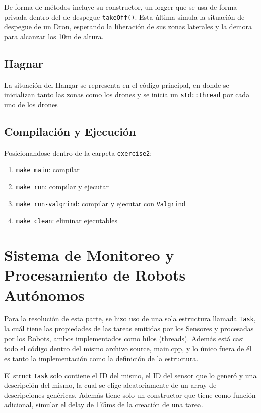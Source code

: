 \documentclass[11pt, a4paper]{article}
\begin{document}
\begin{multicols}{2}
De forma de métodos incluye su constructor, un logger que se usa de forma privada dentro del
de despegue \lstinline|takeOff()|. Esta última simula la situación de despegue de un Dron, esperando
la liberación de sus zonas laterales y la demora para alcanzar los 10m de altura.

\subsection{Hagnar}

La situación del Hangar se representa en el código principal, en donde se inicializan tanto 
las zonas como los drones y se inicia un \lstinline|std::thread| por cada uno de los drones


\subsection{Compilación y Ejecución}

Posicionandose dentro de la carpeta \lstinline|exercise2|:

\begin{enumerate}[label=\roman*.]
    \item \lstinline|make main|: compilar
    \item \lstinline|make run|: compilar y ejecutar
    \item \lstinline|make run-valgrind|: compilar y ejecutar con \lstinline|Valgrind|
    \item \lstinline|make clean|: eliminar ejecutables
\end{enumerate}


\section{Sistema de Monitoreo y Procesamiento de Robots Autónomos}

Para la resolución de esta parte, se hizo uso de una sola estructura
llamada \lstinline|Task|, la cuál tiene las propiedades de las tareas
emitidas por los Sensores y procesadas por los Robots, ambos
implementados como hilos (threads). Además está casi todo el código
dentro del mismo archivo source, main.cpp, y lo único fuera de él es tanto
la implementación como la definición de la estructura.

El struct \lstinline|Task| solo contiene el ID del mismo, el ID del
sensor que lo generó y una descripción del mismo, la cual se elige aleatoriamente
de un array de descripciones genéricas. Además tiene solo un constructor que tiene
como función adicional, simular el delay de 175ms de la creación de una tarea.


\end{multicols}
\end{document}
